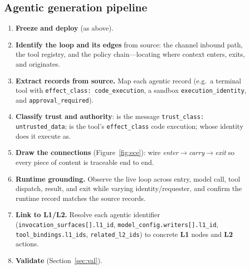 \documentclass[11pt,a4paper]{article}
\newcommand{\cd}[1]{\lstinline[basicstyle=\ttfamily\small]|#1|}
\renewcommand{\L}[1]{\textbf{L#1}}
\begin{document}
\subsection{Agentic generation pipeline}
\begin{enumerate}[leftmargin=1.7em,itemsep=2pt]
\item \textbf{Freeze and deploy} (as above).
\item \textbf{Identify the loop and its edges} from source: the channel inbound path,
      the tool registry, and the policy chain---locating where context enters, exits,
      and originates.
\item \textbf{Extract records from source.} Map each agentic record (e.g.\ a terminal
      tool with \cd{effect_class: code_execution}, a sandbox \cd{execution_identity},
      and \cd{approval_required}).
\item \textbf{Classify trust and authority}: is the message \cd{trust_class:
      untrusted_data}; is the tool's \cd{effect_class} code execution; whose identity
      does it execute as.
\item \textbf{Draw the connections} (Figure~\ref{fig:ece}): wire
      \emph{enter}$\to$\emph{carry}$\to$\emph{exit} so every piece of content is
      traceable end to end.
\item \textbf{Runtime grounding.} Observe the live loop across entry, model call, tool
      dispatch, result, and exit while varying identity/requester, and confirm the
      runtime record matches the source records.
\item \textbf{Link to L1/L2.} Resolve each agentic identifier
      (\cd{invocation_surfaces[].l1_id}, \cd{model_config.writers[].l1_id},
      \cd{tool_bindings.l1_ids}, \cd{related_l2_ids}) to concrete \L1 nodes and \L2
      actions.
\item \textbf{Validate} (Section~\ref{sec:val}).
\end{enumerate}
\end{document}
